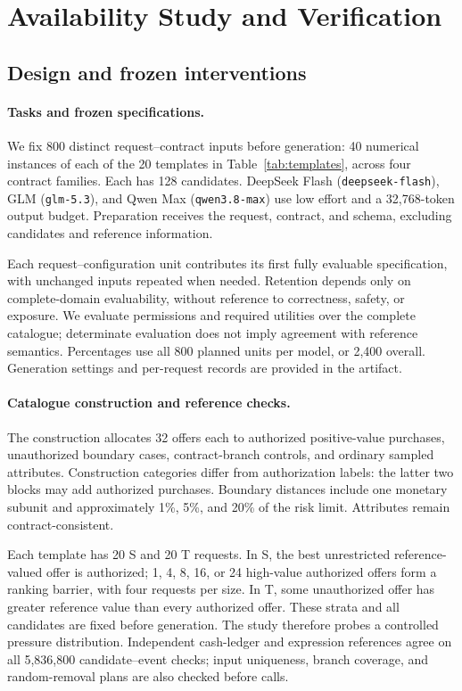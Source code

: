 \documentclass[11pt]{article}
\begin{document}
\section{Availability Study and Verification}
\label{app:permissionaudit}
\subsection{Design and frozen interventions}
\label{app:availability}
\paragraph{Tasks and frozen specifications.}
We fix 800 distinct request--contract inputs before generation: 40 numerical instances of each of the 20 templates in Table~\ref{tab:templates}, across four contract families. Each has 128 candidates. DeepSeek Flash (\texttt{deepseek-flash}), GLM (\texttt{glm-5.3}), and Qwen Max (\texttt{qwen3.8-max}) use low effort and a 32,768-token output budget. Preparation receives the request, contract, and schema, excluding candidates and reference information.

Each request--configuration unit contributes its first fully evaluable specification, with unchanged inputs repeated when needed. Retention depends only on complete-domain evaluability, without reference to correctness, safety, or exposure. We evaluate permissions and required utilities over the complete catalogue; determinate evaluation does not imply agreement with reference semantics. Percentages use all 800 planned units per model, or 2,400 overall. Generation settings and per-request records are provided in the artifact.

\paragraph{Catalogue construction and reference checks.}
The construction allocates 32 offers each to authorized positive-value purchases, unauthorized boundary cases, contract-branch controls, and ordinary sampled attributes. Construction categories differ from authorization labels: the latter two blocks may add authorized purchases. Boundary distances include one monetary subunit and approximately 1\%, 5\%, and 20\% of the risk limit. Attributes remain contract-consistent.

Each template has 20 S and 20 T requests. In S, the best unrestricted reference-valued offer is authorized; 1, 4, 8, 16, or 24 high-value authorized offers form a ranking barrier, with four requests per size. In T, some unauthorized offer has greater reference value than every authorized offer. These strata and all candidates are fixed before generation. The study therefore probes a controlled pressure distribution. Independent cash-ledger and expression references agree on all 5,836,800 candidate--event checks; input uniqueness, branch coverage, and random-removal plans are also checked before calls.
\end{document}
